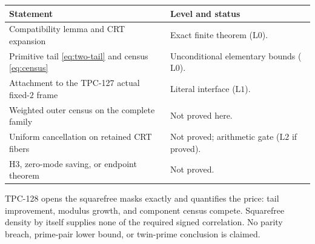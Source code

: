 \documentclass[11pt]{article}
\theoremstyle{definition}
\theoremstyle{remark}
\newcommand{\Lzero}{\mathrm{L0}}
\newcommand{\Lone}{\mathrm{L1}}
\newcommand{\Ltwo}{\mathrm{L2}}
\begin{document}
\begin{center}
\small
\begin{tabularx}{\textwidth}{@{}p{}X@{}}
\toprule
Statement & Level and status\\
\midrule
Compatibility lemma and CRT expansion
& Exact finite theorem (\(\Lzero\)).\\
Primitive tail \eqref{eq:two-tail} and census
\eqref{eq:census}
& Unconditional elementary bounds (\(\Lzero\)).\\
Attachment to the TPC-127 actual fixed-\(2\) frame
& Literal interface (\(\Lone\)).\\
Weighted outer census on the complete family
& Not proved here.\\
Uniform cancellation on retained CRT fibers
& Not proved; arithmetic gate (\(\Ltwo\) if proved).\\
H3, zero-mode saving, or endpoint theorem
& Not proved.\\
\bottomrule
\end{tabularx}
\end{center}

TPC-128 opens the squarefree masks exactly and quantifies the price:
tail improvement, modulus growth, and component census compete.
Squarefree density by itself supplies none of the required signed
correlation.  No parity breach, prime-pair lower bound, or twin-prime
conclusion is claimed.

\begingroup
\footnotesize
\raggedright


\endgroup
\end{document}
